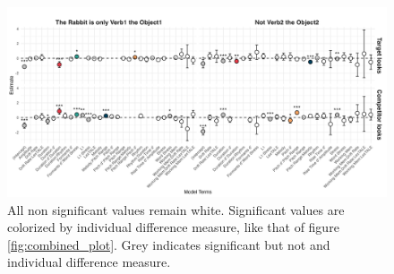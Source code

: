 \begin{figure}[H]  %
    \centering
    \includegraphics[width=\textwidth,height=\textheight,keepaspectratio]{viz/id_gam_mod_out.png}
    \caption{All non significant values remain white. Significant values are colorized by individual difference measure, like that of figure \ref{fig:combined_plot}. Grey indicates significant but not and individual difference measure.}
    \label{fig:id_gam_mod_out}
\end{figure}


